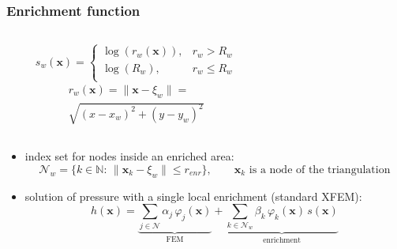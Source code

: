 \documentclass[10pt, xcolor=dvipsnames]{beamer} %
\def\phi{\varphi}
\newcommand{\figpath}{../graphics/}
\begin{document}
\begin{frame}
  \frametitle{Enrichment function}
  \vspace{-20pt}
  \begin{columns}[t]
    \begin{column}{0.48\textwidth}
    \begin{equation*}
      s_w(\mathbf{x}) = 
        \begin{cases}
          \log(r_w(\mathbf{x})), & r_w > R_w\\
          \log(R_w), & r_w \le R_w\\
        \end{cases}
    \end{equation*}
    \begin{multline*}
      r_w(\mathbf{x}) = \|\mathbf{x} - \xi_w\|= \\ 
      \sqrt{(x-x_w)^2+(y-y_w)^2}
    \end{multline*}
    \end{column}
    \begin{column}{0.45\textwidth}
      \begin{figure}[!htb]
        \begin{center}        
          \def\svgwidth{\textwidth}
          
        \end{center}
      \end{figure}
    \end{column}
  \end{columns}
  
  \vspace{20pt}
  \begin{minipage}{\linewidth}
  \begin{itemize}
  \item index set for nodes inside an enriched area:
    \begin{equation*}
      \mathcal{N}_w = \{k \in \mathbb{N}:\, \|\mathbf{x}_k-\xi_w\| \leq r_{enr}\}, \qquad \mathbf{x}_k \textrm{ is a node of the triangulation}
    \end{equation*}
  
  \item solution of pressure with a single local enrichment (standard XFEM):
    \begin{equation*}
      h(\mathbf{x})= \underbrace{\sum \limits_{j\in\mathcal{N}}\alpha_j \, \phi_j(\mathbf{x})}_{\textrm{FEM}} 
      + \underbrace{ \sum \limits_{k\in\mathcal{N}_w} \beta_{k} \,\phi_k(\mathbf{x})\, s(\mathbf{x}) }_{\textrm{enrichment}}
    \end{equation*}

  \end{itemize}
  \end{minipage}
\end{frame}
\end{document}
